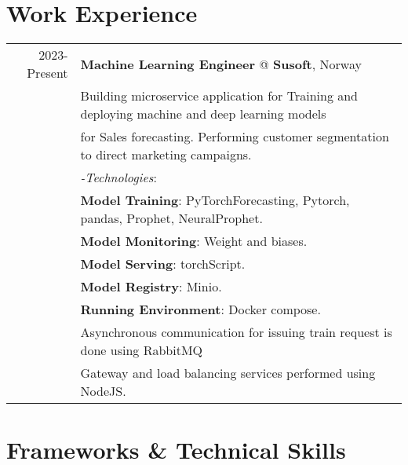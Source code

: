 \documentclass[a4paper,10pt]{article}
\begin{document}

\section{\textbf{Work Experience}}

\begin{tabular}{r|l}
    2023-Present & \textbf{Machine Learning Engineer} @
    \textbf{Susoft}, Norway \\& 
    Building microservice application for Training and deploying machine and deep learning models \\&  for Sales forecasting. 
    Performing customer segmentation to direct marketing campaigns. \\&
    \textit{-Technologies}:\\&
     \textbf{Model Training}: PyTorchForecasting, Pytorch, pandas, Prophet, NeuralProphet. \\&
     \textbf{Model Monitoring}: Weight and biases.\\&
     \textbf{Model Serving}: torchScript. \\&
     \textbf{Model Registry}: Minio. \\&
     \textbf{Running Environment}: Docker compose.\\&
    Asynchronous communication for issuing train request is done using RabbitMQ \\&
    Gateway and load balancing services performed using NodeJS.
\\
\end{tabular}

\section{\textbf{Frameworks \& Technical Skills}}
\end{document}
